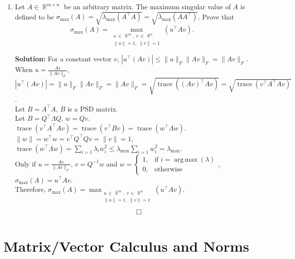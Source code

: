 \documentclass{article}
\newcommand{\Question}[1]{\Large \section{ #1 } \normalsize}
\DeclareMathOperator{\trac}{\mathrm{trace}}
\DeclareMathOperator{\R}{\mathbb{R}}
\DeclareMathOperator*{\argmax}{arg\,max}
\newenvironment{solution}{\color{blue} \smallskip \textbf{Solution:}}{}
\begin{document}
\begin{enumerate}
    \item 
    Let $A\in\R^{m \times n}$ be an arbitrary matrix. 
    The maximum singular value of $A$ is defined to be $\sigma_{\max}(A) = \sqrt{\lambda_{\max}(A^\top A)} = \sqrt{\lambda_{\max}(A A^\top)}$. Prove that
    \[
        \sigma_{\max}(A) = \max_{\substack{u \,\in\, \R^{m},\; v \,\in\, \R^n \\ \|u\|=1,\; \|v\|=1}}(u^\top A v).
    \]
    
    \begin{solution}
        For a constant vector $v$, $|u^\top (A v)| \leq \|u\|_F\|A v\|_F=\|A v\|_F$. \\
        When $u=\frac{Av}{\|Av\|_F}$,  $|u^\top (A v)| = \|u\|_F\|A v\|_F=\|A v\|_F = \sqrt{\trac((Av)^\top Av)}=\sqrt{\trac(v^\top A^\top A v)}$. \\
        Let $B = A^\top A$, $B$ is a PSD matrix. \\
        Let $B = Q^\top\Lambda Q$, $w=Qv$. $\trac(v^\top A^\top A v) = \trac(v^\top B v)=\trac(w^\top \Lambda w)$. \\
        $\|w\|=w^\top w = v^\top Q^\top Q v = \|v\|=1$, $\trac(w^\top \Lambda w) = \sum_{i=1} \lambda_i w_i^2 \leq \lambda_{\max}\sum_{i=1} w_i^2 = \lambda_{\max}$. \\
        Only if $u = \frac{Av}{\|Av\|_F}$, $v = Q^{-1}w$ and 
        $w = \begin{cases} 1, & \text{if } i = \argmax(\lambda) \\ 0, &\text{otherwise} \end{cases}$, $\sigma_{\max}(A) = u^\top A v$. \\
        Therefore, $\sigma_{\max}(A) = \max_{\substack{u \,\in\, \R^{m},\; v \,\in\, \R^n \\ \|u\|=1,\; \|v\|=1}}(u^\top A v)$. 
        \[ \qedhere \]

    \end{solution}

\end{enumerate}

\newpage
\Question{Matrix/Vector Calculus and Norms}
\end{document}
